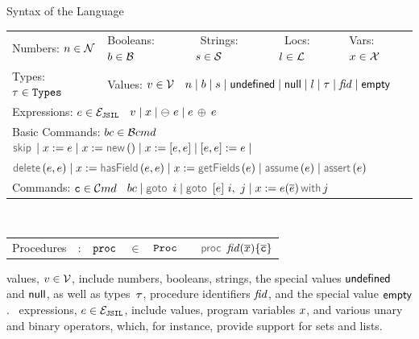 \begin{display}{Syntax of the \jsil Language}\label{def:jsil-types}
\begin{minipage}{\textwidth}
\begin{tabular}{lllll}
	 Numbers: $n \in \mathcal{N}$ & \quad Booleans: $b \in \mathcal{B}$ & \quad \ Strings: $s \in {\mathcal S}$ & \quad \ Locs: $l \in {\mathcal L}$ & \quad Vars: $x \in \mathcal{X}$ \\[0.1cm]
	Types: $\tau \in \mathtt{Types}$ & \multicolumn{4}{l}{\quad Values: $v \in \mathcal{V}$  \ $n \mid b \mid s \mid  {{\sf undefined}} \mid {\sf null} \mid l \mid \tau \mid \mathit{fid} \mid {\sf empty}$} \\[0.1cm]
\multicolumn{5}{l}{Expressions: $e \in \mathcal{E}_{\mathtt{JSIL}}$  \ $v \mid x \mid \ominus\ e \mid e \, \oplus_{} \, e $} \\[0.1cm]
	\multicolumn{5}{l}{Basic Commands: $bc \in \mathcal{B}cmd$ \ $\jsilskip \mid \jvar := \jsilexpr  \mid \jvar := \jsilnew() \mid \jvar := [\jsilexpr, \jsilexpr] \mid [\jsilexpr, \jsilexpr] := \jsilexpr \mid$} \\[0.1cm]
	\multicolumn{5}{l}{\hspace{1.35cm} $\jsildelete(\jsilexpr, \jsilexpr) \mid \jvar := \hasfield(\jsilexpr, \jsilexpr) \mid \jvar := \getfields(\jsilexpr) \mid \assume(\jsilexpr) \mid \assert(\jsilexpr)$} \\[0.1cm]
	\multicolumn{5}{l}{Commands: $\mathtt{c} \in \mathcal{C}md$  \ $ \bcmd \mid \goto \ i \mid  \ifgoto{\jsilexpr}{i}{j} \mid \jsilcall{\jvar}{\jsilexpr}{\jvec{\jsilexpr}}{j}$} 
 \end{tabular} \\[0.1cm]
 \begin{tabular}{rcrclcl}
 	Procedures & : & $\mathtt{proc}$ & $\in$ & $\mathtt{Proc}$ && $\procedure{\fid}{\jvec{\jvar}}{\jvec{\ivlcmd}}$ \\[0.1cm]
 \end{tabular}
 \end{minipage}
 \end{display}
 
\jsil values, $v \in \mathcal{V}$, include numbers, booleans, strings, the special values ${{\sf undefined}}$ and ${\sf null}$, as well as types~$\tau$, procedure identifiers $\mathit{fid}$, and the special value ${\sf empty}$. 
\jsil~expressions, $e \in \mathcal{E}_{\mathtt{JSIL}}$, include \jsil values, \jsil program variables $x$, and various unary and binary operators, which, for instance, provide support for sets and lists. 



